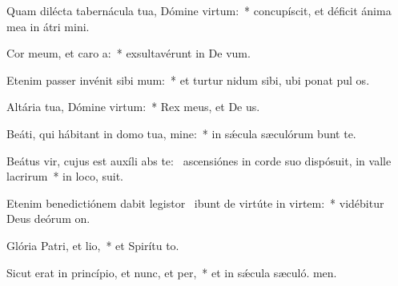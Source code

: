 \item Quam dilécta tabernácula tua, Dómine virtum:~* concupíscit, et déficit ánima mea in átri mini.
\item Cor meum, et caro a:~* exsultavérunt in De vum.
\item Etenim passer invénit sibi mum:~* et turtur nidum sibi, ubi ponat pul os.
\item Altária tua, Dómine virtum:~* Rex meus, et De us.
\item Beáti, qui hábitant in domo tua, mine:~* in sǽcula sæculórum bunt te.
\item Beátus vir, cujus est auxíli abs te:~\pscross{} ascensiónes in corde suo dispósuit, in valle lacrirum~* in loco,  suit.
\item Etenim benedictiónem dabit legistor~\pscross{} ibunt de virtúte in virtem:~* vidébitur Deus deórum  on.
\item Glória Patri, et lio,~* et Spirítu to.
\item Sicut erat in princípio, et nunc, et per,~* et in sǽcula sæculó. men.

